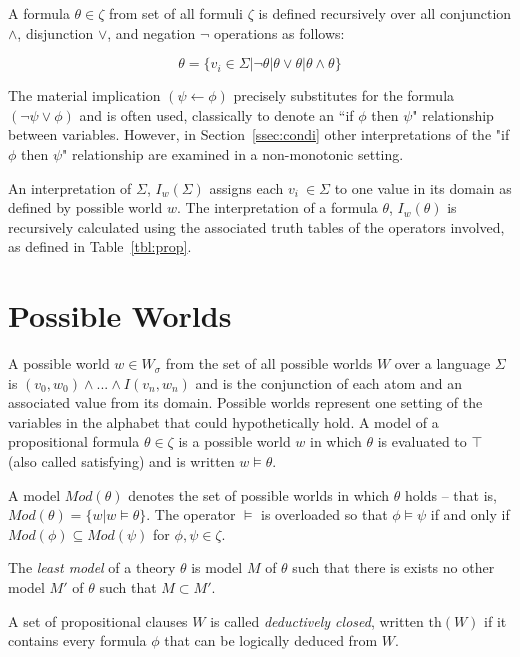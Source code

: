 A formula $\theta \in \zeta$ from set of all formuli $\zeta$ is defined recursively over all conjunction $\land$, disjunction $\lor$, and negation $\lnot$ operations as follows:

\[
\theta = \{ v_i \in \Sigma | \lnot \theta | \theta \lor \theta | \theta \land \theta \}
\]


The material implication $(\psi \leftarrow \phi)$ precisely substitutes for the formula $(\lnot \psi \lor \phi)$ and is often used, classically to denote an ``if $\phi$ then $\psi$" relationship between variables. However, in Section~\ref{ssec:condi} other interpretations of the "if $\phi$ then $\psi$" relationship are examined in a non-monotonic setting.

An interpretation of $\Sigma$, $I_w(\Sigma)$ assigns each $v_i\ \in \Sigma$ to one value in its domain as defined by possible world $w$. The interpretation of a formula $\theta$, $I_w(\theta)$ is recursively calculated using the associated truth tables of the operators involved, as defined in Table~\ref{tbl:prop}. 

\section{Possible Worlds}
A possible world $w\in W_\sigma$ from the set of all possible worlds $W$ over a language $\Sigma$ is $(v_0,w_0) \land ... \land I(v_n,w_n)$ and is the conjunction of each atom and an associated value from its domain. Possible worlds represent one setting of the variables in the alphabet that could hypothetically hold. A model of a propositional formula $\theta \in \zeta$ is a possible world $w$ in which $\theta$ is evaluated to $\top$ (also called satisfying) and is written $w \models \theta$. 

A model $Mod(\theta)$ denotes the set of possible worlds in which $\theta$ holds -- that is, $Mod(\theta)=\{w|w\models \theta\}$. The operator $\models$ is overloaded so that $\phi \models \psi$ if and only if $Mod(\phi) \subseteq Mod(\psi)$ for $\phi,\psi \in \zeta$.

The \textit{least model} of a theory $\theta$ is model $M$ of $\theta$ such that there is  exists no other model $M'$ of $\theta$ such that $M \subset M'$.

A set of propositional clauses $W$ is called \textit{deductively closed}, written $\text{th}(W)$ if it contains every formula $\phi$ that can be logically deduced from $W$. 

